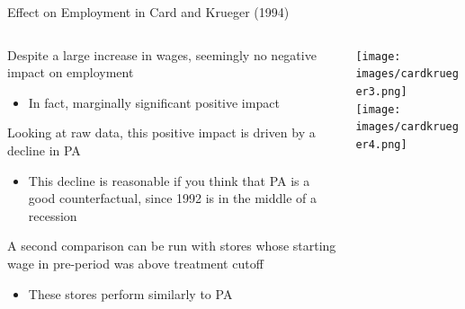 \documentclass[notes,11pt, aspectratio=169]{beamer}
\newenvironment{wideitemize}{\itemize\addtolength{\itemsep}{10pt}}{\enditemize}
\begin{document}
\begin{frame}{Effect on Employment in Card and Krueger (1994) }
  \begin{columns}[T] %
    \begin{column}{0.5\textwidth}
      \begin{wideitemize}
      \item Despite a large increase in wages, seemingly no negative
        impact on employment
        \begin{itemize}
        \item In fact, marginally significant positive impact
        \end{itemize}
      \item Looking at raw data, this positive impact is driven by a
        decline in PA
        \begin{itemize}
        \item This decline is reasonable if you think that PA is a
          good counterfactual, since 1992 is in the middle of a recession
        \end{itemize}
      \item A second comparison can be run with stores whose starting
        wage in pre-period was above treatment cutoff
        \begin{itemize}
        \item These stores perform similarly to PA
        \end{itemize}
      \end{wideitemize}
    \end{column}%
    \hfill%
    \begin{column}{.5\textwidth}
      \texttt{[image: images/cardkrueger3.png]}\\
\hfill      \texttt{[image: images/cardkrueger4.png]}
    \end{column}%
  \end{columns}
\end{frame}
\end{document}
